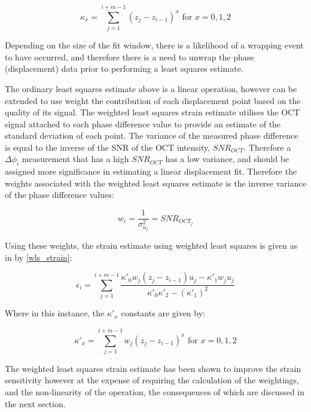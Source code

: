 \begin{equation}
	\label{ols_k}
	\kappa_x = \sum \limits_{j=1}^{i+m-1} (z_j - z_{i-1})^x \text{   for   } x = 0,1,2
\end{equation}

Depending on the size of the fit window, there is a likelihood of a wrapping event to have occurred, and therefore there is a need to unwrap the phase (displacement) data prior to performing a least squares estimate. 

The ordinary least squares estimate above is a linear operation, however can be extended to use weight the contribution of each displacement point based on the quality of its signal. The weighted least squares strain estimate utilises the OCT signal attached to each phase difference value to provide an estimate of the standard deviation of each point. The variance of the measured phase difference is equal to the inverse of the SNR of the OCT intensity, $SNR_{OCT}$. Therefore a $\Delta \phi_i$ measurement that has a high $SNR_{OCT}$ has a low variance, and should be assigned more significance in estimating a linear displacement fit. Therefore the weights associated with the weighted least squares estimate is the inverse variance of the phase difference values:

\begin{equation}
	\label{wls_w}
	w_i = \frac{1}{\sigma_{u_j}^2} = SNR_{OCT_j}
\end{equation}

Using these weights, the strain estimate using weighted least squares is given as in \cite{kennedy_strain_2012} by \autoref{wls_strain}:

\begin{equation}
	\label{wls_strain}
	\epsilon_i = \sum \limits_{j=1}^{i+m-1} \frac{\kappa'_0 w_j (z_j - z_{i-1}) u_j - \kappa'_1 w_	j u_j}{\kappa'_0 \kappa'_2 - (\kappa'_1)^2}
\end{equation}

Where in this instance, the $\kappa'_x$ constants are given by:

\begin{equation}
	\label{wls_k}
	\kappa'_x = \sum \limits_{j=1}^{i+m-1} w_j (z_j - z_{i-1})^x \text{   for   } x=0,1,2
\end{equation}

The weighted least squares strain estimate has been shown to improve the strain sensitivity \cite{kennedy_strain_2012} however at the expense of requiring the calculation of the weightings, and the non-linearity of the operation, the consequences of which are discussed in the next section.

